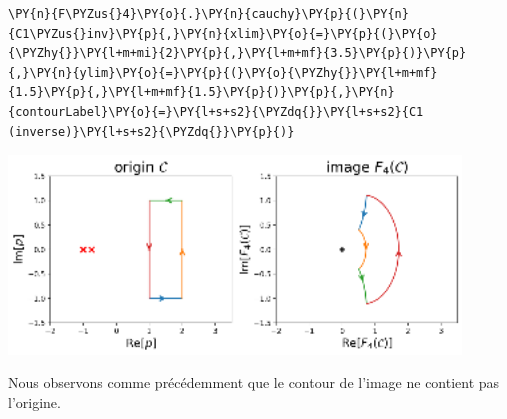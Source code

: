 \begin{tcolorbox}[breakable, size=fbox, boxrule=1pt, pad at break*=1mm,colback=cellbackground, colframe=cellborder]
\begin{Verbatim}[commandchars=\\\{\}]
\PY{n}{F\PYZus{}4}\PY{o}{.}\PY{n}{cauchy}\PY{p}{(}\PY{n}{C1\PYZus{}inv}\PY{p}{,}\PY{n}{xlim}\PY{o}{=}\PY{p}{(}\PY{o}{\PYZhy{}}\PY{l+m+mi}{2}\PY{p}{,}\PY{l+m+mf}{3.5}\PY{p}{)}\PY{p}{,}\PY{n}{ylim}\PY{o}{=}\PY{p}{(}\PY{o}{\PYZhy{}}\PY{l+m+mf}{1.5}\PY{p}{,}\PY{l+m+mf}{1.5}\PY{p}{)}\PY{p}{,}\PY{n}{contourLabel}\PY{o}{=}\PY{l+s+s2}{\PYZdq{}}\PY{l+s+s2}{C1 (inverse)}\PY{l+s+s2}{\PYZdq{}}\PY{p}{)}
\end{Verbatim}
\end{tcolorbox}
\begin{center}
    \includegraphics[width=0.9\textwidth]{notebook/fig/output_40_1.eps}
\end{center}
Nous observons comme précédemment que le contour de l'image ne contient pas l'origine. 
